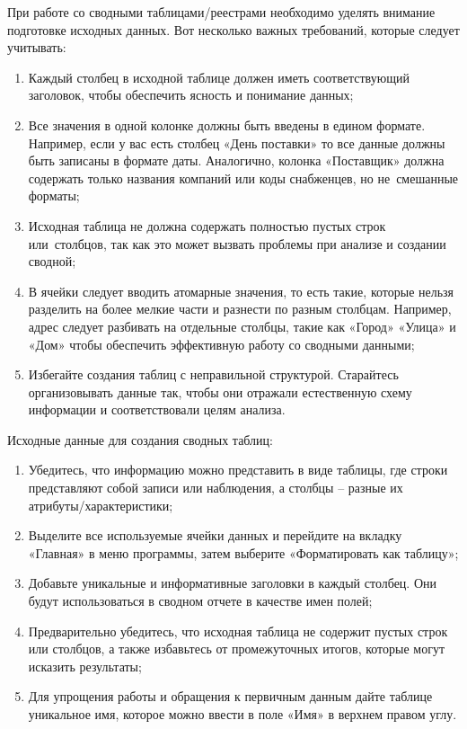 \documentclass{ou}
\begin{document}
При работе со сводными таблицами/реестрами необходимо уделять внимание подготовке исходных данных. Вот несколько важных требований, которые следует учитывать:
\begin{enumerate}[leftmargin=0em, itemindent=3.75em, nosep, label=\arabic*)]
\item Каждый столбец в исходной таблице должен иметь соответствующий заголовок, чтобы обеспечить ясность и понимание данных;
\item Все значения в одной колонке должны быть введены в едином формате. Например, если у вас есть столбец «День поставки» то все данные должны быть записаны в формате даты. Аналогично, колонка «Поставщик» должна содержать только названия компаний или коды снабженцев, но не~смешанные форматы;
\item Исходная таблица не должна содержать полностью пустых строк или~столбцов, так как это может вызвать проблемы при анализе и создании сводной;
\item В ячейки следует вводить атомарные значения, то есть такие, которые нельзя разделить на более мелкие части и разнести по разным столбцам. Например, адрес следует разбивать на отдельные столбцы, такие как «Город» «Улица» и «Дом» чтобы обеспечить эффективную работу со сводными данными;
\item Избегайте создания таблиц с неправильной структурой. Старайтесь организовывать данные так, чтобы они отражали естественную схему информации и соответствовали целям анализа. 
\end{enumerate}

Исходные данные для создания сводных таблиц:
\begin{enumerate}[leftmargin=0em, itemindent=3.75em, nosep, label=\arabic*)]
\item Убедитесь, что информацию можно представить в виде таблицы, где строки представляют собой записи или наблюдения, а столбцы -- разные их атрибуты/характеристики;
\item Выделите все используемые ячейки данных и перейдите на вкладку «Главная» в меню программы, затем выберите «Форматировать как таблицу»;
\item Добавьте уникальные и информативные заголовки в каждый столбец. Они будут использоваться в сводном отчете в качестве имен полей;
\item Предварительно убедитесь, что исходная таблица не содержит пустых строк или столбцов, а также избавьтесь от промежуточных итогов, которые могут исказить результаты;
\item Для упрощения работы и обращения к первичным данным дайте таблице уникальное имя, которое можно ввести в поле «Имя» в верхнем правом углу.
\end{enumerate}
\end{document}
